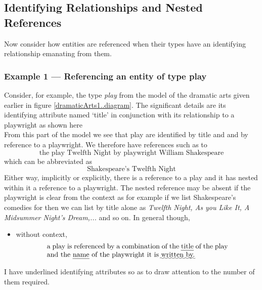 \subsection{Identifying Relationships and Nested References}
\mynote
Now consider how entities are referenced when their types have an identifying relationship  emanating from them. 

\subsubsection*{Example 1 --- Referencing an entity of type play}
Consider, for example, the type \textit{play} from the model of the dramatic arts given earlier in figure \ref{dramaticArts1..diagram}. The significant details are its identifying attribute named `title' 
in conjunction with its relationship to a playwright
as shown here 
\begin{equation*}

\end{equation*}
From this part of the model we see that play are identified by title and
and by reference to a playwright.
\mynote
We therefore have references such as to
\begin{equation}
\mbox{the play Twelfth Night by playwright William Shakespeare}
\end{equation}
which can be abbreviated as
\begin{equation}
\mbox{Shakespeare's Twelfth Night}
\end{equation}
Either way, implicitly or explicitly, there is a reference to a play and it has 
nested within it a reference to a playwright.
The nested reference may be absent if the playwright is clear from the context as for example if we list Shakespeare's comedies for then we can list by title alone as \textit{Twelfth Night, As you Like It,
A Midsummer Night's Dream,...} and so on.
In general though,
\begin{itemize} 
\item without context, 
\begin{equation} 
\label{absolutePlayReferencing}
\text{\parbox{9cm}{a  play 
is referenced by a combination of the \uline{title} of the play and the \uline{name} of the playwright it is \uwave{written by.}}}
\end{equation}
\end{itemize}
I have underlined  identifying attributes so as to draw attention to the number of them required.

